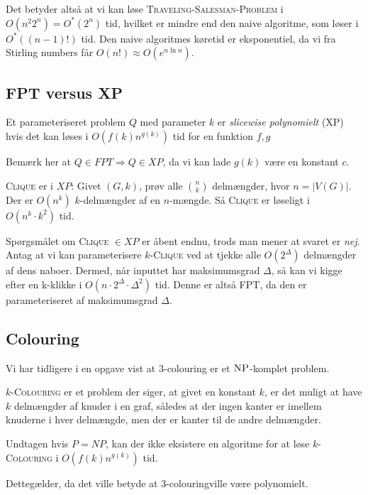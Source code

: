 Det betyder altså at vi kan løse \textsc{Traveling-Salesman-Problem} i $O(n^{2}2^{n}) = O^{*}(2^{n})$ tid, hvilket er mindre end den naive algoritme, som løser i $O^{*}((n-1)!)$ tid. Den naive algoritmes køretid er eksponentiel, da vi fra Stirling numbers får $O(n!) \approx O(e^{n \ln n})$.

\subsection{FPT versus XP}%
\label{subsec:label}

\begin{definition}
	Et parameteriseret problem $Q$ med parameter $k$ er \textit{slicewise polynomielt} (XP) hvis det kan løses i $O(f(k) n^{g(k)})$ tid for en funktion $f,g$
\end{definition}

Bemærk her at $Q \in FPT \Rightarrow Q \in XP$, da vi kan lade $g(k)$ være en konstant $c$.

\textsc{Clique} er i $XP$: Givet $(G,k)$, prøv alle $\binom{n}{k}$ delmængder, hvor $n = |V(G)|$. Der er $O(n^{k})$ $k$-delmængder af en $n$-mængde. Så \textsc{Clique} er løseligt i $O(n^{k} \cdot k^{2})$ tid.

Spørgsmålet om \textsc{Clique} $\in XP$ er åbent endnu, trods man mener at svaret er \textit{nej}. Antag at vi kan parameterisere \textsc{$k$-Clique} ved at tjekke alle $O(2^{\Delta})$ delmængder af dens naboer. Dermed, når inputtet har maksimumsgrad $\Delta$, så kan vi kigge efter en k-klikke i $O(n \cdot 2^{\Delta} \cdot \Delta^{2})$ tid. Denne er altså FPT, da den er parameteriseret af maksimumsgrad \(\Delta\).


\subsection{Colouring}%
\label{subsec:label}

Vi har tidligere i en opgave vist at $3$-colouring er et $\textsc{NP}$-komplet problem.

\begin{definition}
	\textsc{$k$-Colouring} er et problem der siger, at givet en konstant $k$, er det muligt at have $k$ delmængder af knuder i en graf, således at der ingen kanter er imellem knuderne i hver delmængde, men der er kanter til de andre delmængder.
\end{definition}

\begin{lemma}
	Undtagen hvis $P = NP$, kan der ikke eksistere en algoritme for at løse \textsc{$k$-Colouring} i $O(f(k)n^{g(k)})$ tid.
\end{lemma}
Dettegælder, da det ville betyde at $3$-colouringville være polynomielt.




